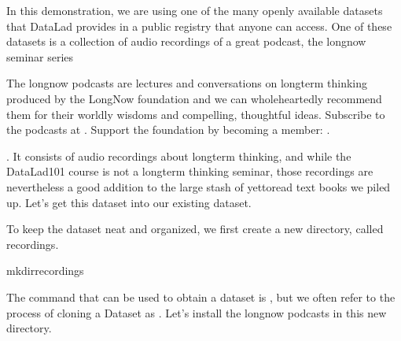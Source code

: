 \sphinxAtStartPar
In this demonstration, we are using one of the many openly available datasets that
DataLad provides in a public registry that anyone can access. One of these datasets is a
collection of audio recordings of a great podcast, the longnow seminar series%
\begin{footnote}\sphinxAtStartFootnote
The longnow podcasts are lectures and conversations on long\sphinxhyphen{}term thinking produced by
the LongNow foundation and we can wholeheartedly recommend them for their worldly
wisdoms and compelling, thoughtful ideas. Subscribe to the podcasts at .
Support the foundation by becoming a member: .
%
\end{footnote}.
It consists of audio recordings about long\sphinxhyphen{}term thinking, and while the DataLad\sphinxhyphen{}101
course is not a long\sphinxhyphen{}term thinking seminar, those recordings are nevertheless a
good addition to the large stash of yet\sphinxhyphen{}to\sphinxhyphen{}read text books we piled up.
Let’s get this dataset into our existing  dataset.

\sphinxAtStartPar
To keep the  dataset neat and organized, we first create a new directory,
called recordings.

\begin{sphinxVerbatim}[commandchars=\\\{\}]
mkdirrecordings
\end{sphinxVerbatim}

\sphinxAtStartPar
The command that can be used to obtain a dataset is ,
but we often refer to the process of cloning a Dataset as .
Let’s install the longnow podcasts in this new directory.

